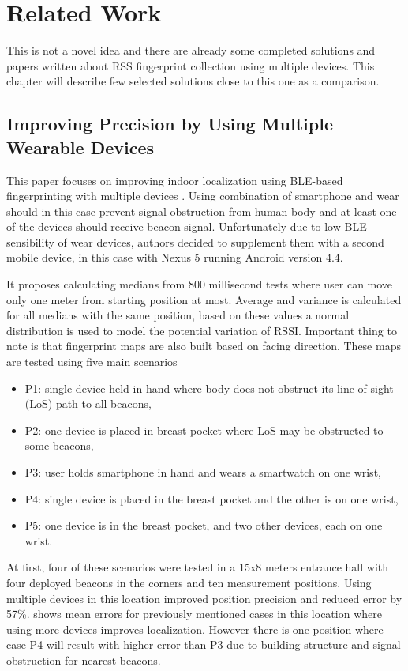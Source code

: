\chapter{Related Work}\label{sec:RelatedWork}
This is not a novel idea and there are already some completed solutions and papers written about RSS fingerprint collection using multiple devices. This chapter will describe few selected solutions close to this one as a comparison.

\section{Improving Precision by Using Multiple Wearable Devices}\label{sec:IPUMWD}
This paper focuses on improving indoor localization using BLE-based fingerprinting with multiple devices \cite{IPBLEIUMWD}. Using combination of smartphone and wear should in this case prevent signal obstruction from human body and at least one of the devices should receive beacon signal. Unfortunately due to low BLE sensibility of wear devices, authors decided to supplement them with a second mobile device, in this case with Nexus 5 running Android version 4.4.

It proposes calculating medians from 800 millisecond tests where user can move only one meter from starting position at most. Average and variance is calculated for all medians with the same position, based on these values a normal distribution is used to model the potential variation of RSSI. Important thing to note is that fingerprint maps are also built based on facing direction. These maps are tested using five main scenarios

\begin{itemize}
	\item P1: single device held in hand where body does not obstruct its line of sight (LoS) path to all beacons,
	\item P2: one device is placed in breast pocket where LoS may be obstructed to some beacons,
	\item P3: user holds smartphone in hand and wears a smartwatch on one wrist,
	\item P4: single device is placed in the breast pocket and the other is on one wrist,
	\item P5: one device is in the breast pocket, and two other devices, each on one wrist.
\end{itemize} 

At first, four of these scenarios were tested in a 15x8 meters entrance hall with four deployed beacons in the corners and ten measurement positions. Using multiple devices in this location improved position precision and reduced error by 57\%.  shows mean errors for previously mentioned cases in this location where using more devices improves localization. However there is one position where case P4 will result with higher error than P3 due to building structure and signal obstruction for nearest beacons.


